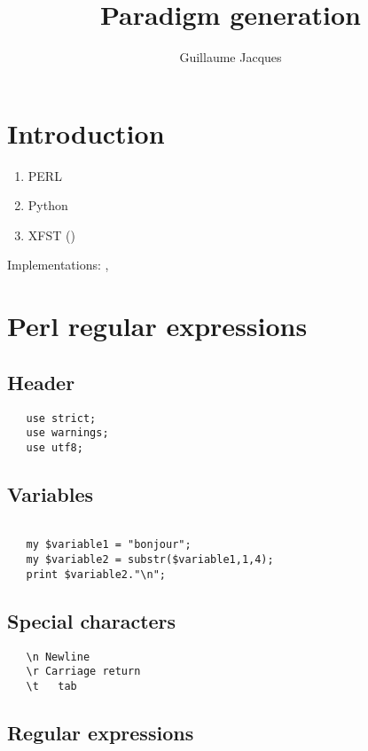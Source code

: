 \documentclass[oldfontcommands,oneside,a4paper,11pt]{article}
\begin{document}
 

\title{Paradigm generation}
\author{Guillaume Jacques}
\maketitle
\section{Introduction}
\begin{enumerate}
\item PERL
\item Python
\item XFST (\citealt{bessley03fsm})
\end{enumerate}

Implementations: \citet{jacques12khaling}, \citet{walther14compactness}



\section{Perl regular expressions}


\subsection{Header}
\begin{verbatim}
   use strict;
   use warnings;
   use utf8;
\end{verbatim}

\subsection{Variables}

\begin{verbatim}

   my $variable1 = "bonjour";
   my $variable2 = substr($variable1,1,4);
   print $variable2."\n";

\end{verbatim}

\subsection{Special characters}
\begin{verbatim}
   \n Newline
   \r Carriage return
   \t	tab 
\end{verbatim}

\subsection{Regular expressions}
\end{document}

